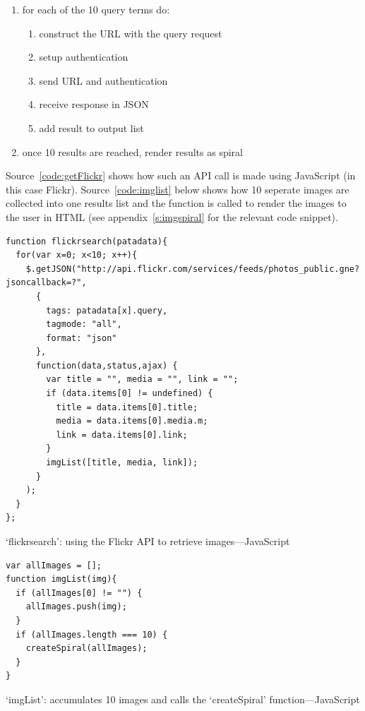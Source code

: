 \begin{enumerate}
  \item for each of the 10 query terms do:
  \begin{enumerate}
    \item construct the \ac{URL} with the query request
    \item setup authentication
    \item send \ac{URL} and authentication
    \item receive response in \ac{JSON}
    \item add result to output list 
  \end{enumerate}
  \item once 10 results are reached, render results as spiral
\end{enumerate}

Source~\ref{code:getFlickr} shows how such an \ac{API} call is made using JavaScript (in this case Flickr). Source~\ref{code:imglist} below shows how 10 seperate images are collected into one results list and the  function is called to render the images to the user in \ac{HTML} (see appendix~\ref{s:imgspiral} for the relevant code snippet).

\begin{listing}[!htbp] %
  \begin{verbatim}
function flickrsearch(patadata){
  for(var x=0; x<10; x++){
    $.getJSON("http://api.flickr.com/services/feeds/photos_public.gne?jsoncallback=?",
      {
        tags: patadata[x].query,
        tagmode: "all",
        format: "json"
      },
      function(data,status,ajax) {
        var title = "", media = "", link = "";
        if (data.items[0] != undefined) {
          title = data.items[0].title;
          media = data.items[0].media.m;
          link = data.items[0].link;
        }
        imgList([title, media, link]);
      }
    );
  }
};
  \end{verbatim}
\caption[`flickrsearch' function---JavaScript]{`flickrsearch': using the Flickr API to retrieve images---JavaScript}
\label{code:getFlickr}
\end{listing}

\begin{listing}[!htbp] %
  \begin{verbatim}
var allImages = [];
function imgList(img){
  if (allImages[0] != "") {
    allImages.push(img);
  }
  if (allImages.length === 10) {
    createSpiral(allImages);
  }
}
  \end{verbatim}
\caption[`imgList' function---JavaScript]{`imgList': accumulates 10 images and calls the `createSpiral' function---JavaScript}
\label{code:imglist}
\end{listing}


